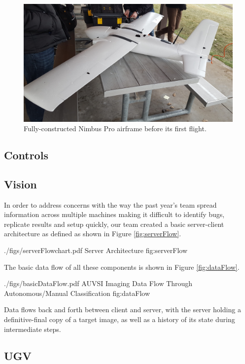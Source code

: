 \documentclass[]{auvsi_doc}
\begin{document}
\begin{figure}[h!]
	\centering
	\includegraphics[width=.9\columnwidth]{figs/plane1}
	\caption{Fully-constructed Nimbus Pro airframe before its first flight.}
	\label{fig:plane1}
\end{figure}

\subsection{Controls}


\subsection{Vision}

In order to address concerns with the way the past year's team spread information
across multiple machines making it difficult to identify bugs, replicate
results and setup quickly, our team created a
basic server-client architecture as defined as shown in Figure \ref{fig:serverFlow}.

\AUVSIFigure
{./figs/serverFlowchart.pdf}
{\textwidth}
{Server Architecture}
{fig:serverFlow}

The basic data flow of all these components is shown in Figure \ref{fig:dataFlow}.

\AUVSIFigure
{./figs/basicDataFlow.pdf}
{\textwidth}
{AUVSI Imaging Data Flow Through Autonomous/Manual Classification}
{fig:dataFlow}

Data flows back and forth between client and server, with the server holding a definitive-final
copy of a target image, as well as a history of its state during intermediate steps.

\subsection{UGV}
\end{document}
